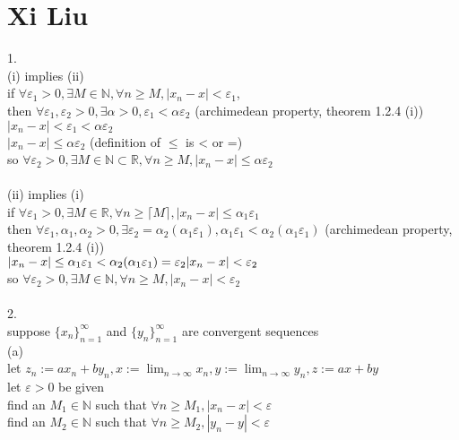 \documentclass[12pt, border = 4pt, multi]{article} %
\begin{document}
\section*{Xi Liu}
1.\\
(i) implies (ii)\\
if $\forall \varepsilon_1 > 0, \exists M \in \mathbb{N}, \forall n \geq M, |x_n - x| < \varepsilon_1$,\\
then $\forall \varepsilon_1, \varepsilon_2 > 0, \exists \alpha > 0, \varepsilon_1 < \alpha \varepsilon_2$ (archimedean property, theorem 1.2.4 (i))\\
$|x_n - x| < \varepsilon_1 < \alpha \varepsilon_2$\\
$|x_n - x| \leq \alpha\varepsilon_2$ (definition of $\leq$ is < or =)\\
so $\forall \varepsilon_2 > 0, \exists M \in \mathbb{N} \subset \mathbb{R}, \forall n \geq M, |x_n - x| \leq \alpha\varepsilon_2$\\
\\
(ii) implies (i)\\
if $\forall \varepsilon_1 > 0, \exists M \in \mathbb{R}, \forall n \geq \lceil M \rceil, |x_n - x| \leq \alpha_1\varepsilon_1$\\
then $\forall \varepsilon_1, \alpha_1, \alpha_2 > 0, \exists \varepsilon_2 = \alpha_2(\alpha_1\varepsilon_1), \alpha_1\varepsilon_1 < \alpha_2(\alpha_1 \varepsilon_1)$ (archimedean property, theorem 1.2.4 (i))\\
$|x_n - x| \leq \alpha_1\varepsilon_1 < \alpha_2(\alpha_1\varepsilon_1) = \varepsilon_2\\
|x_n - x| < \varepsilon_2$\\
so $\forall \varepsilon_2 > 0, \exists M \in \mathbb{N}, \forall n \geq M, |x_n - x| < \varepsilon_2$\\
\\
2.\\
suppose $\{x_n\}_{n = 1} ^ {\infty}$ and $\{y_n\}_{n = 1} ^ {\infty}$ are convergent sequences\\
(a)\\
let $z_n := ax_n + by_n, x := \lim_{n \rightarrow \infty} x_n, y := \lim_{n \rightarrow \infty} y_n, z := ax + by$\\
let $\varepsilon > 0$ be given\\
find an $M_1 \in \mathbb{N}$ such that $\forall n \geq M_1, |x_n - x| < \varepsilon$\\
find an $M_2 \in \mathbb{N}$ such that $\forall n \geq M_2, |y_n - y| < \varepsilon$\\
\end{document}
